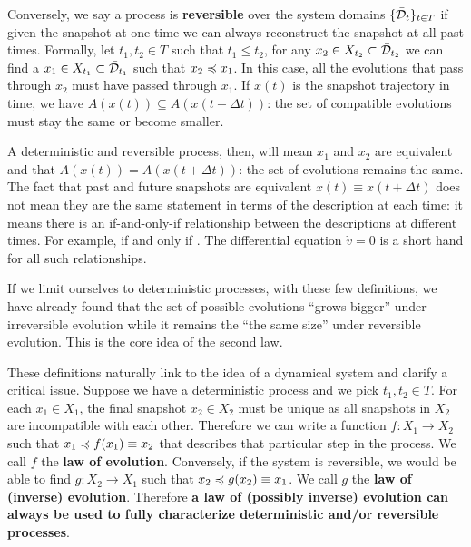 \documentclass[letterpaper]{article}
\begin{document}
Conversely, we say a process is \textbf{reversible} over the system domains $\{\bar{\mathcal{D}}_t\}_{t \in T}$ if given the snapshot at one time we can always reconstruct the snapshot at all past times. Formally, let $t_1, t_2 \in T$ such that $t_1 \leq t_2$, for any $x_2 \in X_{t_2} \subset \bar{\mathcal{D}}_{t_2}$ we can find a $x_1 \in X_{t_1} \subset \bar{\mathcal{D}}_{t_1}$ such that $x_2 \preccurlyeq x_1$. In this case, all the evolutions that pass through $x_2$ must have passed through $x_1$. If $x(t)$ is the snapshot trajectory in time, we have $A(x(t)) \subseteq A(x(t - \Delta t))$: the set of compatible evolutions must stay the same or become smaller.

A deterministic and reversible process, then, will mean $x_1$ and $x_2$ are equivalent and that  $A(x(t)) = A(x(t + \Delta t))$: the set of evolutions remains the same. The fact that past and future snapshots are equivalent $x(t) \equiv x(t + \Delta t)$ does not mean they are the same statement in terms of the description at each time: it means there is an if-and-only-if relationship between the descriptions at different times. For example,  if and only if . The differential equation $\dot{v} = 0$ is a short hand for all such relationships.

If we limit ourselves to deterministic processes, with these few definitions, we have already found that the set of possible evolutions ``grows bigger'' under irreversible evolution while it remains the ``the same size'' under reversible evolution. This is the core idea of the second law.

These definitions naturally link to the idea of a dynamical system and clarify a critical issue. Suppose we have a deterministic process and we pick $t_1, t_2 \in T$. For each $x_1 \in X_1$, the final snapshot $x_2 \in X_2$ must be unique as all snapshots in $X_2$ are incompatible with each other. Therefore we can write a function $f : X_1 \to X_2$ such that $x_1 \preccurlyeq f(x_1) \equiv x_2$ that describes that particular step in the process. We call $f$ the \textbf{law of evolution}. Conversely, if the system is reversible, we would be able to find $g : X_2 \to X_1$ such that $x_2 \preccurlyeq g(x_2) \equiv x_1$.  We call $g$ the \textbf{law of (inverse) evolution}. Therefore \textbf{a law of (possibly inverse) evolution can always be used to fully characterize deterministic and/or reversible processes}.
\end{document}
